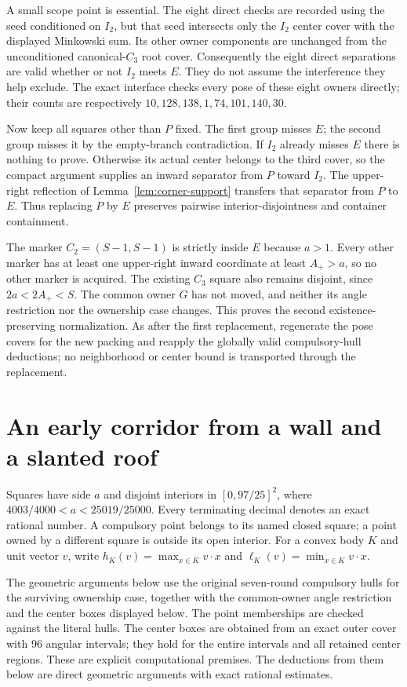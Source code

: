 \documentclass[11pt]{article}
\begin{document}
A small scope point is essential. The eight direct checks are recorded
using the seed conditioned on $I_2$, but that seed intersects only the
$I_2$ center cover with the displayed Minkowski sum. Its other owner
components are unchanged from the unconditioned canonical-$C_3$ root
cover. Consequently the eight direct separations are valid whether or not
$I_2$ meets $E$. They do not assume the interference they help exclude.
The exact interface checks every pose of these eight owners directly;
their counts are respectively
$10,128,138,1,74,101,140,30$.

Now keep all squares other than $P$ fixed. The first group misses $E$;
the second group misses it by the empty-branch contradiction. If $I_2$
already misses $E$ there is nothing to prove. Otherwise its actual center
belongs to the third cover, so the compact argument supplies an inward
separator from $P$ toward $I_2$. The upper-right reflection of
Lemma~\ref{lem:corner-support} transfers that separator from $P$ to $E$.
Thus replacing $P$ by $E$ preserves pairwise interior-disjointness and
container containment.

The marker $C_2=(S-1,S-1)$ is strictly inside $E$ because $a>1$.
Every other marker has at least one upper-right inward coordinate at
least $A_+>a$, so no other marker is acquired. The existing $C_3$ square
also remains disjoint, since $2a<2A_+<S$. The common owner $G$ has not
moved, and neither its angle restriction nor the ownership case changes.
This proves the second existence-preserving normalization.
As after the first replacement, regenerate the pose covers for the new
packing and reapply the globally valid compulsory-hull deductions; no
neighborhood or center bound is transported through the replacement.


\section{An early corridor from a wall and a slanted roof}\label{app:early-corridor}
Squares have side $a$ and disjoint interiors in $[0,97/25]^2$, where
$4003/4000<a<25019/25000$. Every terminating decimal denotes an exact
rational number. A compulsory point belongs to its named closed square;
a point owned by a different square is outside its open interior.
For a convex body $K$ and unit vector $v$, write
$h_K(v)=\max_{x\in K}v\cdot x$ and
$\ell_K(v)=\min_{x\in K}v\cdot x$.

The geometric arguments below use the original seven-round compulsory
hulls for the surviving ownership case, together with the common-owner
angle restriction and the center boxes displayed below. The point
memberships are checked against the literal hulls. The center boxes are
obtained from an exact outer cover with 96 angular intervals; they hold
for the entire intervals and all retained center regions.
These are explicit computational premises. The deductions from them below
are direct geometric arguments with exact rational estimates.
\end{document}
